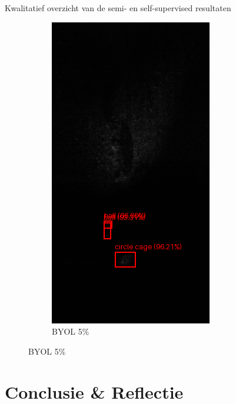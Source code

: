 \documentclass[aspectratio=169]{beamer}
\begin{document}
\begin{frame}{Kwalitatief overzicht van de semi- en self-supervised resultaten}
\begin{figure}
\begin{subfigure}{.2\textwidth}
                \includegraphics[width=0.9\linewidth]{1_faster_rcnn_5_byol.png}
                \caption{BYOL 5\%}
            \end{subfigure}%
        \end{figure}
    \end{frame}
    
    \section{Conclusie \& Reflectie}
    
\end{document}
